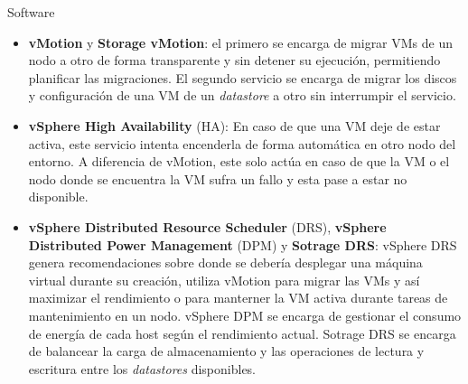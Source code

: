 \begin{section}{Software}
\begin{itemize}
    \item \textbf{vMotion} y \textbf{Storage vMotion}: el primero se encarga de migrar VMs de un nodo a otro de forma transparente y sin detener su ejecución, permitiendo planificar las migraciones. El segundo servicio se encarga de migrar los discos y configuración de una VM de un \textit{datastore} a otro sin interrumpir el servicio.
    
    \item \textbf{vSphere High Availability} (HA): En caso de que una VM deje de estar activa, este servicio intenta encenderla de forma automática en otro nodo del entorno. A diferencia de vMotion, este solo actúa en caso de que la VM o el nodo donde se encuentra la VM sufra un fallo y esta pase a estar no disponible. 
    
    
    \item \textbf{vSphere Distributed Resource Scheduler} (DRS), \textbf{vSphere Distributed Power Management} (DPM) y \textbf{Sotrage DRS}: vSphere DRS genera recomendaciones sobre donde se debería desplegar una máquina virtual durante su creación, utiliza vMotion para migrar las VMs y así maximizar el rendimiento o para manterner la VM activa durante tareas de mantenimiento en un nodo. vSphere DPM se encarga de gestionar el consumo de energía de cada host según el rendimiento actual. Sotrage DRS se encarga de balancear la carga de almacenamiento y las operaciones de lectura y escritura entre los \textit{datastores} disponibles.
    

\end{itemize}
\end{section}
